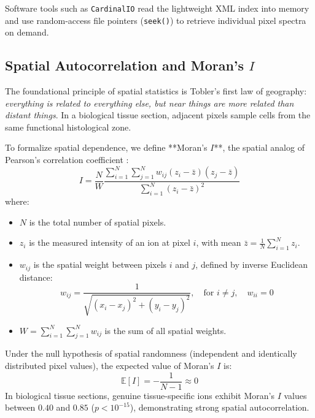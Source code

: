 \documentclass[11pt,twoside,openright]{book}
\begin{document}
Software tools such as \texttt{CardinalIO} read the lightweight XML index into memory and use random-access file pointers (\texttt{seek()}) to retrieve individual pixel spectra on demand.

\subsection{Spatial Autocorrelation and Moran's \texorpdfstring{$I$}{I}}

The foundational principle of spatial statistics is Tobler's first law of geography: \textit{everything is related to everything else, but near things are more related than distant things}. In a biological tissue section, adjacent pixels sample cells from the same functional histological zone.

To formalize spatial dependence, we define **Moran's $I$**, the spatial analog of Pearson's correlation coefficient \cite{moran1950notes}:
\begin{equation}
I = \frac{N}{W} \frac{\sum_{i=1}^{N} \sum_{j=1}^{N} w_{ij} (z_i - \bar{z})(z_j - \bar{z})}{\sum_{i=1}^{N} (z_i - \bar{z})^2}
\label{eq:morans_i}
\end{equation}
where:
\begin{itemize}
    \item $N$ is the total number of spatial pixels.
    \item $z_i$ is the measured intensity of an ion at pixel $i$, with mean $\bar{z} = \frac{1}{N} \sum_{i=1}^N z_i$.
    \item $w_{ij}$ is the spatial weight between pixels $i$ and $j$, defined by inverse Euclidean distance:
    \begin{equation}
    w_{ij} = \frac{1}{\sqrt{(x_i - x_j)^2 + (y_i - y_j)^2}}, \quad \text{for } i \ne j, \quad w_{ii} = 0
    \end{equation}
    \item $W = \sum_{i=1}^N \sum_{j=1}^N w_{ij}$ is the sum of all spatial weights.
\end{itemize}

Under the null hypothesis of spatial randomness (independent and identically distributed pixel values), the expected value of Moran's $I$ is:
\begin{equation}
\mathbb{E}[I] = -\frac{1}{N - 1} \approx 0
\label{eq:moran_expected}
\end{equation}
In biological tissue sections, genuine tissue-specific ions exhibit Moran's $I$ values between $0.40$ and $0.85$ ($p < 10^{-15}$), demonstrating strong spatial autocorrelation.
\end{document}
